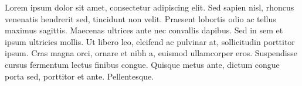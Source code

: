 Lorem ipsum dolor sit amet, consectetur adipiscing elit. Sed sapien nisl,
rhoncus venenatis hendrerit sed, tincidunt non velit. Praesent lobortis odio ac
tellus maximus sagittis. Maecenas ultrices ante nec convallis dapibus. Sed in
sem et ipsum ultricies mollis. Ut libero leo, eleifend ac pulvinar at,
sollicitudin porttitor ipsum. Cras magna orci, ornare et nibh a, euismod
ullamcorper eros. Suspendisse cursus fermentum lectus finibus congue. Quisque
metus ante, dictum congue porta sed, porttitor et ante. Pellentesque.
